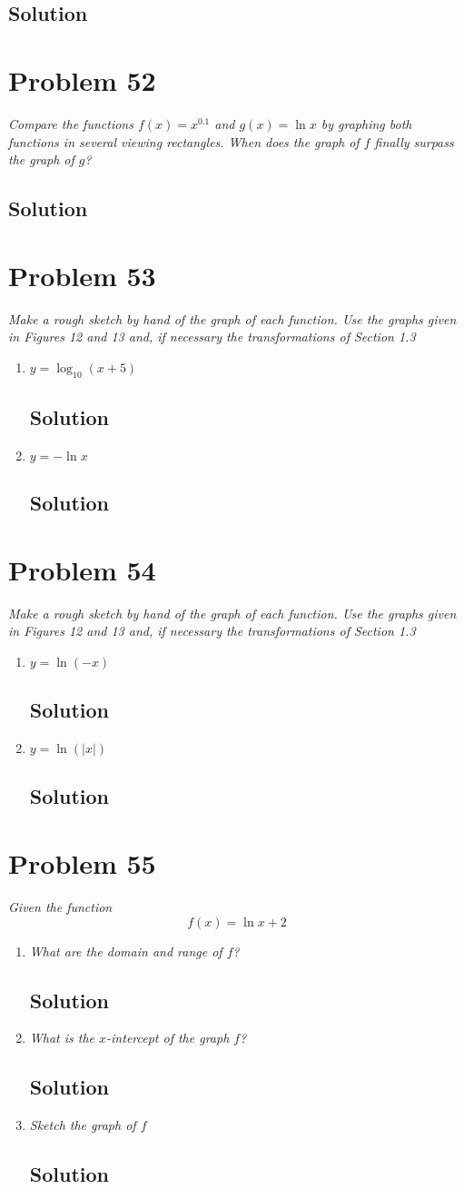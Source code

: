 \documentclass[11pt]{article}
\newcommand{\soln}{\subsection*}
\newcommand{\qn}{\textit}
\begin{document}
\soln{Solution}

\section*{Problem 52}

\qn{Compare the functions $f(x)=x^{0.1}$ and $g(x)=\ln{x}$ by graphing both functions in several viewing rectangles. When does the graph of $f$ finally surpass the graph of $g$?}

\soln{Solution}

\section*{Problem 53}

\qn{Make a rough sketch by hand of the graph of each function. Use the graphs given in Figures 12 and 13 and, if necessary the transformations of Section 1.3}
\begin{enumerate}
	\item \qn{$y=\log_{10}(x+5)$}
	\soln{Solution}
	
	\item \qn{$y=-\ln{x}$}
	\soln{Solution}
\end{enumerate}

\section*{Problem 54}

\qn{Make a rough sketch by hand of the graph of each function. Use the graphs given in Figures 12 and 13 and, if necessary the transformations of Section 1.3}
\begin{enumerate}
	\item \qn{$y=\ln(-x)$}
	\soln{Solution}
	
	\item \qn{$y=\ln(|x|)$}
	\soln{Solution}
\end{enumerate}

\section*{Problem 55}

\qn{Given the function $$f(x)=\ln{x}+2$$}
\begin{enumerate}
	\item \qn{What are the domain and range of $f$?}
	\soln{Solution}
	
	\item \qn{What is the $x$-intercept of the graph $f$?}
	\soln{Solution}
	
	\item \qn{Sketch the graph of $f$}
	\soln{Solution}
\end{enumerate}
\end{document}
